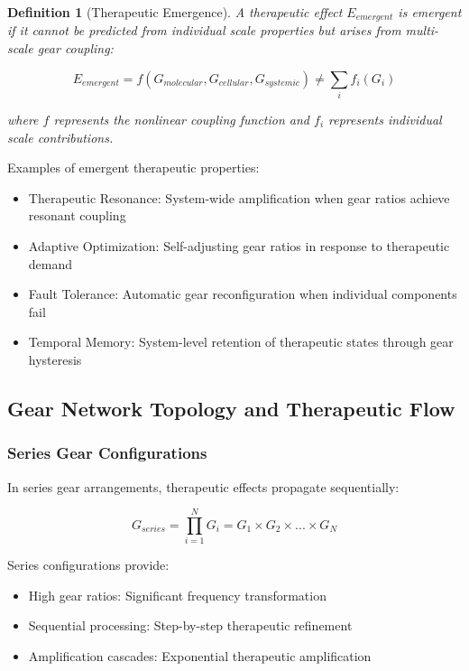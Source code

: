 \documentclass[12pt,a4paper]{article}
\newtheorem{definition}{Definition}[section]
\begin{document}
\begin{definition}[Therapeutic Emergence]
A therapeutic effect $E_{emergent}$ is emergent if it cannot be predicted from individual scale properties but arises from multi-scale gear coupling:

\begin{equation}
E_{emergent} = f(G_{molecular}, G_{cellular}, G_{systemic}) \neq \sum_{i} f_i(G_i)
\end{equation}

where $f$ represents the nonlinear coupling function and $f_i$ represents individual scale contributions.
\end{definition}

Examples of emergent therapeutic properties:

\begin{itemize}
\item Therapeutic Resonance: System-wide amplification when gear ratios achieve resonant coupling
\item Adaptive Optimization: Self-adjusting gear ratios in response to therapeutic demand
\item Fault Tolerance: Automatic gear reconfiguration when individual components fail
\item Temporal Memory: System-level retention of therapeutic states through gear hysteresis
\end{itemize}

\subsection{Gear Network Topology and Therapeutic Flow}

\subsubsection{Series Gear Configurations}

In series gear arrangements, therapeutic effects propagate sequentially:

\begin{equation}
G_{series} = \prod_{i=1}^{N} G_i = G_1 \times G_2 \times ... \times G_N
\end{equation}

Series configurations provide:
\begin{itemize}
\item High gear ratios: Significant frequency transformation
\item Sequential processing: Step-by-step therapeutic refinement
\item Amplification cascades: Exponential therapeutic amplification
\end{itemize}
\end{document}
